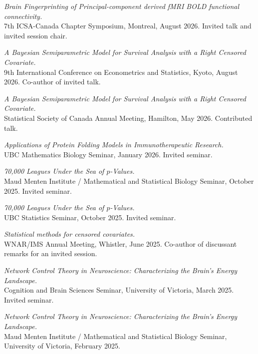 \documentclass[9pt]{extarticle}
\begin{document}
{\normalsize
\textit{Brain Fingerprinting of Principal-component derived fMRI BOLD functional connectivity.}\\
7th ICSA-Canada Chapter Symposium, Montreal, August 2026. Invited talk and invited session chair.\par\vspace{6pt}

\textit{A Bayesian Semiparametric Model for Survival Analysis with a Right Censored Covariate.}\\
9th International Conference on Econometrics and Statistics, Kyoto, August 2026. Co-author of invited talk.\par\vspace{6pt}

\textit{A Bayesian Semiparametric Model for Survival Analysis with a Right Censored Covariate.}\\
Statistical Society of Canada Annual Meeting, Hamilton, May 2026. Contributed talk.\par\vspace{6pt}

\textit{Applications of Protein Folding Models in Immunotherapeutic Research.}\\
UBC Mathematics Biology Seminar, January 2026. Invited seminar.\par\vspace{6pt}

\textit{70,000 Leagues Under the Sea of $p$-Values.}\\
Maud Menten Institute / Mathematical and Statistical Biology Seminar, October 2025. Invited seminar.\par\vspace{6pt}

\textit{70,000 Leagues Under the Sea of $p$-Values.}\\
UBC Statistics Seminar, October 2025. Invited seminar.\par\vspace{6pt}

\textit{Statistical methods for censored covariates.}\\
WNAR/IMS Annual Meeting, Whistler, June 2025. Co-author of discussant remarks for an invited session.\par\vspace{6pt}

\textit{Network Control Theory in Neuroscience: Characterizing the Brain's Energy Landscape.}\\
Cognition and Brain Sciences Seminar, University of Victoria, March 2025. Invited seminar.\par\vspace{6pt}

\textit{Network Control Theory in Neuroscience: Characterizing the Brain's Energy Landscape.}\\
Maud Menten Institute / Mathematical and Statistical Biology Seminar, University of Victoria, February 2025.\par
}
\end{document}
